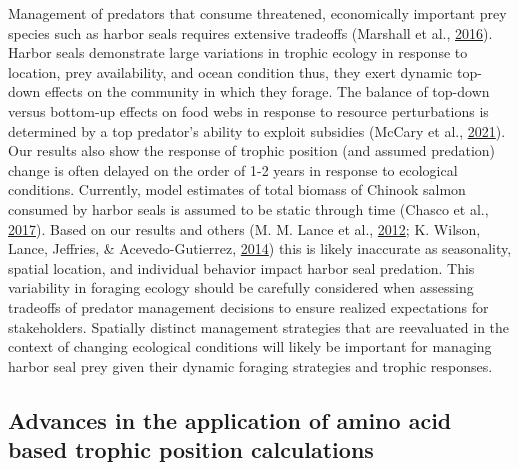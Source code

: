 \documentclass [11pt, proquest] {uwthesis}[2015/03/03]
\begin{document}
Management of predators that consume threatened, economically important
prey species such as harbor seals requires extensive tradeoffs (Marshall
et al., \protect\hyperlink{ref-Marshall2016}{2016}). Harbor seals
demonstrate large variations in trophic ecology in response to location,
prey availability, and ocean condition thus, they exert dynamic top-down
effects on the community in which they forage. The balance of top-down
versus bottom-up effects on food webs in response to resource
perturbations is determined by a top predator's ability to exploit
subsidies (McCary et al., \protect\hyperlink{ref-McCary2021}{2021}). Our
results also show the response of trophic position (and assumed
predation) change is often delayed on the order of 1-2 years in response
to ecological conditions. Currently, model estimates of total biomass of
Chinook salmon consumed by harbor seals is assumed to be static through
time (Chasco et al., \protect\hyperlink{ref-Chasco2017}{2017}). Based on
our results and others (M. M. Lance et al.,
\protect\hyperlink{ref-Lance2012}{2012}; K. Wilson, Lance, Jeffries, \&
Acevedo-Gutierrez, \protect\hyperlink{ref-Wilson2014}{2014}) this is
likely inaccurate as seasonality, spatial location, and individual
behavior impact harbor seal predation. This variability in foraging
ecology should be carefully considered when assessing tradeoffs of
predator management decisions to ensure realized expectations for
stakeholders. Spatially distinct management strategies that are
reevaluated in the context of changing ecological conditions will likely
be important for managing harbor seal prey given their dynamic foraging
strategies and trophic responses.

\subsection{Advances in the application of amino acid based trophic
position
calculations}\label{advances-in-the-application-of-amino-acid-based-trophic-position-calculations}
\end{document}
